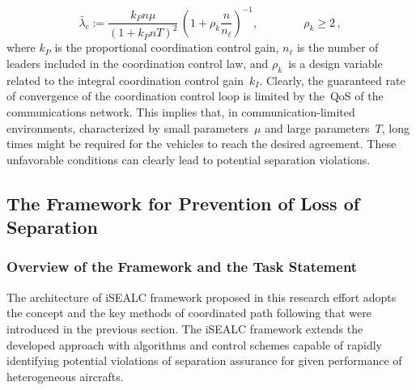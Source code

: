 \documentclass[letter,onecolumn,12pt]{aiaa-tc}
\newcommand{\1}{1_n}
\begin{document}
\begin{equation}\label{eq:CommLim.convrate}
\bar{\lambda}_{c} := \frac{k_{P}n\mu}{(1+k_{P}nT)^2}\,\left(1+\rho_{k}\frac{n}{n_{\ell}}\right)^{-1}, \qquad\qquad
\rho_{k}\geq2\,,
\end{equation}
where $k_{P}$ is the proportional coordination control gain, $n_{\ell}$ is the number of leaders included in the coordination control law, and $\rho_{k}$~is a design variable related to the integral coordination control gain~$k_{I}$. Clearly, the guaranteed rate of convergence of the coordination control loop is limited by the~QoS of the communications network. This implies that, in communication-limited environments, characterized by small parameters~$\mu$ and large parameters~$T$, long times might be required for the vehicles to reach the desired agreement. These unfavorable conditions can clearly lead to potential separation violations.


\subsection{The Framework for Prevention of Loss of Separation }
\label{subsec:framework}

\subsubsection{Overview of the Framework and the Task Statement}
The architecture of iSEALC framework proposed in this research effort adopts the concept and the key methods of coordinated path following that were introduced in the previous section. The iSEALC framework extends the developed  approach with algorithms and control schemes capable of rapidly identifying potential violations of separation assurance for given performance of heterogeneous aircrafts.
\end{document}
